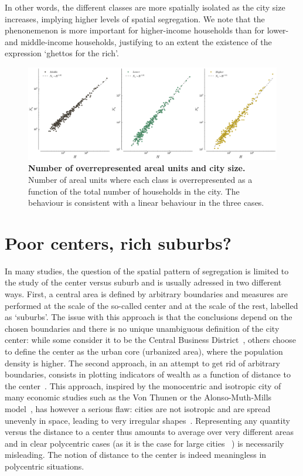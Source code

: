 In other words, the different classes are more spatially isolated as the city
size increases, implying higher levels of spatial segregation. We note that the
phenonemenon is more important for higher-income households than for lower- and
middle-income households, justifying to an extent the existence of the
expression `ghettos for the rich'.\\

\begin{figure}
    \centering
    \includegraphics[width=\textwidth]{./gfx/chapter-segregation/number_overrepresented.pdf}
    \caption{{\bf Number of overrepresented areal units and city size.} Number of areal units where each class is overrepresented as a
    function of the total number of households in the city. The behaviour is
consistent with a linear behaviour in the three cases.
\label{fig:overrepresented}}
\end{figure}


\section{Poor centers, rich suburbs?}
\label{sec:poor_centers_rich_suburbs_}

In many studies, the question of the spatial pattern of segregation is limited
to the study of the center versus suburb and is usually adressed in two
different ways. First, a central area is defined by arbitrary boundaries and
measures are performed at the scale of the so-called center and at the scale of
the  rest, labelled as `suburbs'. The issue with this approach is that the
conclusions depend on the chosen boundaries and there is no unique unambiguous
definition of the city center: while some consider it to be the Central Business
District~\cite{Glaeser:2008}, others choose to define the center as the urban
core (urbanized area), where the population density is higher. The second
approach, in an attempt to get rid of arbitrary boundaries, consists in plotting
indicators of wealth as a function of distance to the
center~\cite{Glaeser:2008}. This approach, inspired by the monocentric and
isotropic city of many economic studies such as the Von Thunen or the
Alonso-Muth-Mills model~\cite{Brueckner:1987}, has however a serious flaw:
cities are not isotropic and are spread unevenly in space, leading to very
irregular shapes~\cite{Makse:1995}. Representing any quantity versus the
distance to a center thus amounts to average over very different areas and in
clear polycentric cases (as it is the case for large cities
~\cite{Louf:2013_polycentric})
is necessarily misleading. The notion of distance to the center is indeed
meaningless in polycentric situations.\\


